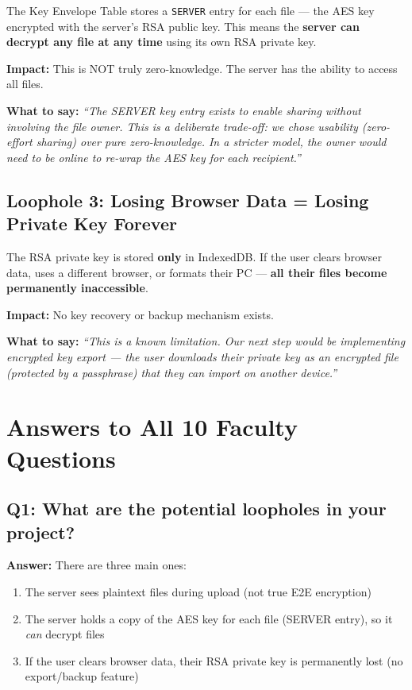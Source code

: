 \documentclass[11pt,a4paper]{article}
\begin{document}
The Key Envelope Table stores a \texttt{SERVER} entry for each file --- the AES key encrypted with the server's RSA public key. This means the \textbf{server can decrypt any file at any time} using its own RSA private key.

\textbf{Impact:} This is NOT truly zero-knowledge. The server has the ability to access all files.

\textbf{What to say:} \textit{``The SERVER key entry exists to enable sharing without involving the file owner. This is a deliberate trade-off: we chose usability (zero-effort sharing) over pure zero-knowledge. In a stricter model, the owner would need to be online to re-wrap the AES key for each recipient.''}

\subsection{Loophole 3: Losing Browser Data = Losing Private Key Forever}

The RSA private key is stored \textbf{only} in IndexedDB. If the user clears browser data, uses a different browser, or formats their PC --- \textbf{all their files become permanently inaccessible}.

\textbf{Impact:} No key recovery or backup mechanism exists.

\textbf{What to say:} \textit{``This is a known limitation. Our next step would be implementing encrypted key export --- the user downloads their private key as an encrypted file (protected by a passphrase) that they can import on another device.''}

\vspace{0.5cm}

\section{Answers to All 10 Faculty Questions}

\subsection{Q1: What are the potential loopholes in your project?}

\textbf{Answer:} There are three main ones:
\begin{enumerate}
  \item The server sees plaintext files during upload (not true E2E encryption)
  \item The server holds a copy of the AES key for each file (SERVER entry), so it \textit{can} decrypt files
  \item If the user clears browser data, their RSA private key is permanently lost (no export/backup feature)
\end{enumerate}
\end{document}
